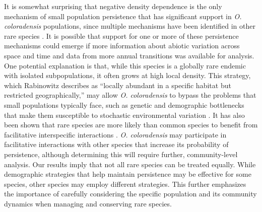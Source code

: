 \documentclass[12pt, letterpaper]{article}
\begin{document}
It is somewhat surprising that negative density dependence is the only mechanism of small population persistence that has significant support in \textit{O. coloradensis} populations, since multiple mechanisms have been identified in other rare species \cite{Dibner2019}. It is possible that support for one or more of these persistence mechanisms could emerge if more information about abiotic variation across space and time and data from more annual transitions was available for analysis. One potential explanation is that, while this species is a globally rare endemic with isolated subpopulations, it often grows at high local density. This strategy, which Rabinowitz describes as “locally abundant in a specific habitat but restricted geographically,” may allow \textit{O. coloradensis} to bypass the problems that small populations typically face, such as genetic and demographic bottlenecks that make them susceptible to stochastic environmental variation \cite{Rabinowitz1981SevenRarity}. It has also been shown that rare species are more likely than common species to benefit from facilitative interspecific interactions \cite{Calatayud2020PositiveAssemblages}. \textit{O. coloradensis} may participate in facilitative interactions with other species that increase its probability of persistence, although determining this will require further, community-level analysis. Our results imply that not all rare species can be treated equally. While demographic strategies that help maintain persistence may be effective for some species, other species may employ different strategies. This further emphasizes the importance of carefully considering the specific population and its community dynamics when managing and conserving rare species.  

\end{document}
